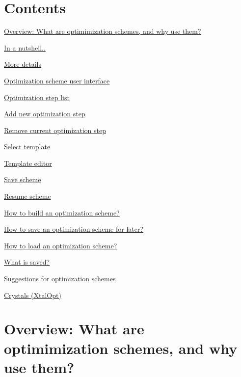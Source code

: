 \hypertarget{tut-xo_Contents}{}\section{Contents}\label{tut-xo_Contents}

\begin{DoxyItemize}
\item \hyperlink{optschemes_overview}{Overview\-: What are optimimization schemes, and why use them?}
\begin{DoxyItemize}
\item \hyperlink{optschemes_quick-over}{In a nutshell..}
\item \hyperlink{optschemes_detailed-over}{More details}
\end{DoxyItemize}
\item \hyperlink{optschemes_gui}{Optimization scheme user interface}
\begin{DoxyItemize}
\item \hyperlink{optschemes_gui-list}{Optimization step list}
\item \hyperlink{optschemes_gui-add}{Add new optimization step}
\item \hyperlink{optschemes_gui-rem}{Remove current optimization step}
\item \hyperlink{optschemes_gui-tselect}{Select template}
\item \hyperlink{optschemes_gui-editor}{Template editor}
\item \hyperlink{optschemes_gui-save}{Save scheme}
\item \hyperlink{optschemes_gui-load}{Resume scheme}
\end{DoxyItemize}
\item \hyperlink{optschemes_creating}{How to build an optimization scheme?}
\item \hyperlink{optschemes_saving}{How to save an optimization scheme for later?}
\item \hyperlink{optschemes_loading}{How to load an optimization scheme?}
\item \hyperlink{optschemes_format}{What is saved?}
\item \hyperlink{optschemes_suggest}{Suggestions for optimization schemes}
\begin{DoxyItemize}
\item \hyperlink{optschemes_sug-xtal}{Crystals (Xtal\-Opt)}
\end{DoxyItemize}
\end{DoxyItemize}\hypertarget{optschemes_overview}{}\section{Overview\-: What are optimimization schemes, and why use them?}\label{optschemes_overview}
